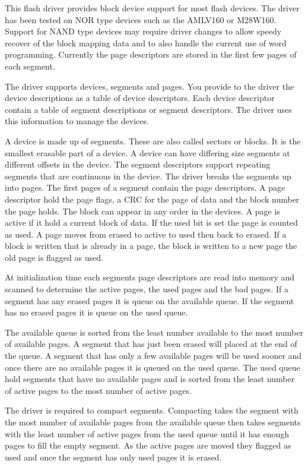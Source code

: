 This flash driver provides block device support for most flash devices. The driver has been tested on N\+OR type devices such as the A\+M\+L\+V160 or M28\+W160. Support for N\+A\+ND type devices may require driver changes to allow speedy recover of the block mapping data and to also handle the current use of word programming. Currently the page descriptors are stored in the first few pages of each segment.

The driver supports devices, segments and pages. You provide to the driver the device descriptions as a table of device descriptors. Each device descriptor contain a table of segment descriptions or segment descriptors. The driver uses this information to manage the devices.

A device is made up of segments. These are also called sectors or blocks. It is the smallest erasable part of a device. A device can have differing size segments at different offsets in the device. The segment descriptors support repeating segments that are continuous in the device. The driver breaks the segments up into pages. The first pages of a segment contain the page descriptors. A page descriptor hold the page flags, a C\+RC for the page of data and the block number the page holds. The block can appear in any order in the devices. A page is active if it hold a current block of data. If the used bit is set the page is counted as used. A page moves from erased to active to used then back to erased. If a block is written that is already in a page, the block is written to a new page the old page is flagged as used.

At initialization time each segment\textquotesingle{}s page descriptors are read into memory and scanned to determine the active pages, the used pages and the bad pages. If a segment has any erased pages it is queue on the available queue. If the segment has no erased pages it is queue on the used queue.

The available queue is sorted from the least number available to the most number of available pages. A segment that has just been erased will placed at the end of the queue. A segment that has only a few available pages will be used sooner and once there are no available pages it is queued on the used queue. The used queue hold segments that have no available pages and is sorted from the least number of active pages to the most number of active pages.

The driver is required to compact segments. Compacting takes the segment with the most number of available pages from the available queue then takes segments with the least number of active pages from the used queue until it has enough pages to fill the empty segment. As the active pages are moved they flagged as used and once the segment has only used pages it is erased.

